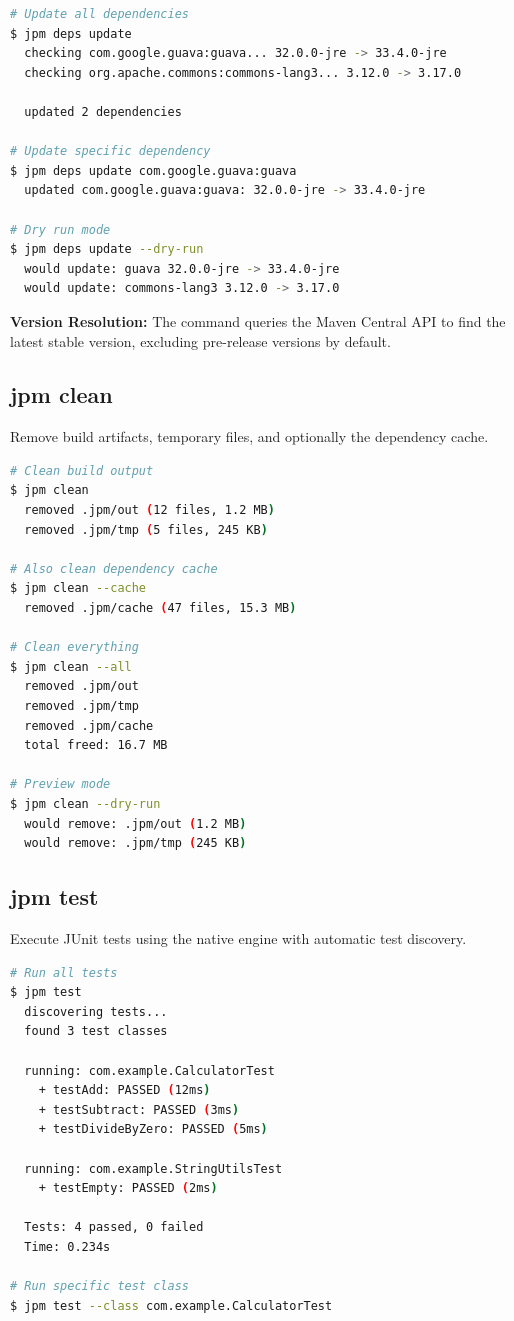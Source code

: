 \documentclass[12pt,a4paper]{report}
\begin{document}
\begin{lstlisting}[language=bash, caption=Dependency Updates]
# Update all dependencies
$ jpm deps update
  checking com.google.guava:guava... 32.0.0-jre -> 33.4.0-jre
  checking org.apache.commons:commons-lang3... 3.12.0 -> 3.17.0
  
  updated 2 dependencies

# Update specific dependency
$ jpm deps update com.google.guava:guava
  updated com.google.guava:guava: 32.0.0-jre -> 33.4.0-jre

# Dry run mode
$ jpm deps update --dry-run
  would update: guava 32.0.0-jre -> 33.4.0-jre
  would update: commons-lang3 3.12.0 -> 3.17.0
\end{lstlisting}

\textbf{Version Resolution:} The command queries the Maven Central API to find the latest stable version, excluding pre-release versions by default.

\subsection{jpm clean}

Remove build artifacts, temporary files, and optionally the dependency cache.

\begin{lstlisting}[language=bash, caption=Project Cleaning]
# Clean build output
$ jpm clean
  removed .jpm/out (12 files, 1.2 MB)
  removed .jpm/tmp (5 files, 245 KB)

# Also clean dependency cache
$ jpm clean --cache
  removed .jpm/cache (47 files, 15.3 MB)

# Clean everything
$ jpm clean --all
  removed .jpm/out
  removed .jpm/tmp
  removed .jpm/cache
  total freed: 16.7 MB

# Preview mode
$ jpm clean --dry-run
  would remove: .jpm/out (1.2 MB)
  would remove: .jpm/tmp (245 KB)
\end{lstlisting}

\subsection{jpm test}

Execute JUnit tests using the native engine with automatic test discovery.

\begin{lstlisting}[language=bash, caption=Test Execution]
# Run all tests
$ jpm test
  discovering tests...
  found 3 test classes
  
  running: com.example.CalculatorTest
    + testAdd: PASSED (12ms)
    + testSubtract: PASSED (3ms)
    + testDivideByZero: PASSED (5ms)
  
  running: com.example.StringUtilsTest
    + testEmpty: PASSED (2ms)
  
  Tests: 4 passed, 0 failed
  Time: 0.234s

# Run specific test class
$ jpm test --class com.example.CalculatorTest
\end{lstlisting}
\end{document}
